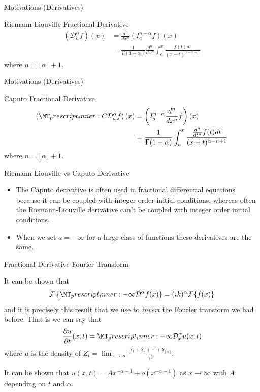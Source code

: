 \documentclass[pdf]{beamer}
\newcommand{\lra}{\longrightarrow}
\newcommand{\rld}[3]{ \left( \mathcal{D}_{#1}^{#2} #3 \right) }
\newcommand{\rli}[3]{ \left( I_{#1}^{#2} #3 \right) }
\newcommand{\capder}[3]{ \left( \prescript{C}{}{\mathcal{D}_{#1}^{#2}} #3 \right) }
\begin{document}
\begin{frame}{Motivations (Derivatives)}
	\begin{block}{Riemann-Liouville Fractional Derivative}
		\begin{align*}
			\rld{a}{\alpha}{f}(x) &= \frac{d^{n}}{dx^{n}} \rli{a}{n - \alpha}{f}(x) \\
				&= \frac{1}{\Gamma(1 - \alpha)}\frac{d^{n}}{dx^n} \int_a^x \frac{f(t)dt}{(x-t)^{\alpha - n + 1}}
		\end{align*}
		where $ n = \lfloor \alpha \rfloor + 1 $.
	\end{block}
\end{frame}

\begin{frame}{Motivations (Derivatives)}
	\begin{block}{Caputo Fractional Derivative}
		\begin{align*}
			\capder{a}{\alpha}{f}(x) &= \rli{a}{n - \alpha}{\frac{d^{n}}{dx^{n}}f}(x) \\
				&= \frac{1}{\Gamma(1 - \alpha)} \int_a^x \frac{\frac{d^{n}}{dt^n}f(t)dt}{(x-t)^{\alpha - n + 1}}
		\end{align*}
		where $ n = \lfloor \alpha \rfloor + 1 $.
	\end{block}
\end{frame}
\begin{frame}{ Riemann-Liouville vs Caputo Derivative}
    \begin{itemize}
	\item The Caputo derivative is often used in fractional differential equations because it
	can be coupled with integer order initial conditions, whereas often the Riemann-Liouville
	derivative can't be coupled with integer order initial conditions.
   
    \item When we set $ a = -\infty $ for a large class of functions these derivatives are the same.
    \end{itemize}
\end{frame}

\begin{frame}{Fractional Derivative Fourier Transform}

	It can be shown that
	\begin{align}
	    \mathcal{F}\left\{\prescript{}{-\infty}{\mathcal{D}^\alpha}f(x) \right\} = (ik)^\alpha \mathcal{F}\{ f(x) \}
    \end{align}
    and it is precisely this result that we use to \emph{invert} the Fourier transform we had before.
    That is we can say that
    \begin{align}
        \frac{\partial u}{\partial t}(x,t) = \prescript{}{-\infty}{\mathcal{D}^\alpha_x} u(x,t)
    \end{align}
    where $u $ is the density of $ Z_t = \lim_{\gamma\lra\infty} \frac{Y_1 + Y_2 + \cdots + Y_{\lfloor \gamma t \rfloor}}{\gamma^\frac{1}{\alpha}} $.
    
    It can be shown that $ u(x,t) = Ax^{-\alpha-1} + o(x^{-\alpha-1}) $ as $ x \lra \infty $ with $ A $ depending on $ t $ and $ \alpha $.
\end{frame}
\end{document}
